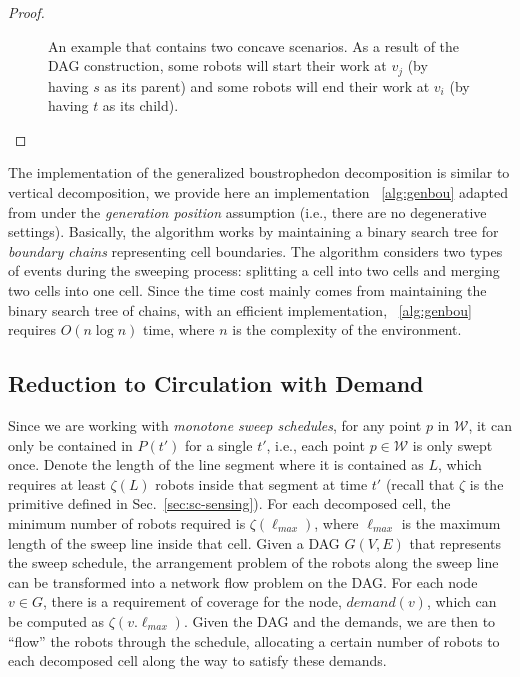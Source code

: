 \begin{proof}
\begin{figure} [ht]
    \caption[An example that contains two concave scenarios]
    {An example that contains two concave scenarios. As a result of the DAG construction, some robots will
    start their work at $v_j$ (by having $s$ as its parent) and some robots will end their work at $v_i$ (by having $t$ as its child).}
    \label{fig:sc-concave_vertices}
\end{figure}
\end{proof}




The implementation of the generalized boustrophedon decomposition is similar 
to vertical decomposition, we provide here an implementation 
~\ref{alg:genbou} adapted from \cite{lavalle2006sweepline} under the 
\emph{generation position} assumption (i.e., there are no degenerative 
settings).
%
Basically, the algorithm works by maintaining a binary search tree for 
\emph{boundary chains} representing cell boundaries. The algorithm considers 
two types of events during the sweeping process: splitting a cell into two 
cells and merging two cells into one cell.
%
Since the time cost mainly comes from maintaining the binary search tree of 
chains, with an efficient implementation, ~\ref{alg:genbou} requires 
$O(n \log n)$ time, where $n$ is the complexity of the environment. 


\subsection{Reduction to Circulation with Demand}
Since we are working with \emph{monotone sweep schedules}, for any point $p$ in 
$\mathcal W$, it can only be contained in $P(t')$ for a single $t'$, i.e., each 
point $p \in \mathcal W$ is only swept once. 
%
Denote the length of the line segment where it is contained as $L$, which 
requires at least $\zeta(L)$ robots inside that segment at time $t'$
(recall that $\zeta$ is the primitive defined in Sec.~\ref{sec:sc-sensing}).
%
For each decomposed cell, the minimum number of robots required is $\zeta(\ell_{max})$, where $\ell_{max}$ 
is the maximum length of the sweep line inside that cell.
%
Given a DAG $G(V,E)$ that represents the sweep schedule, the arrangement problem of the robots along the sweep line can be transformed into a network 
flow problem on the DAG.
%
For each node $v\in G$, there is a requirement of coverage for the node, 
$demand(v)$, which can be computed as $\zeta(v.\ell_{max})$.
%
Given the DAG and the demands, we are then to ``flow'' the robots through 
the schedule, allocating a certain number of robots to each decomposed cell 
along the way to satisfy these demands. 
%

